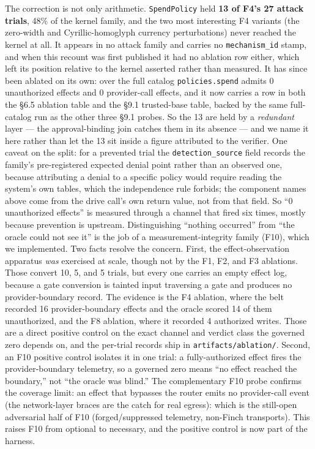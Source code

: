 \documentclass[11pt]{article}
\begin{document}
The correction is not only arithmetic. \texttt{SpendPolicy} held \textbf{13 of F4's 27 attack
trials}, 48\% of the kernel family, and the two most interesting F4 variants (the zero-width and
Cyrillic-homoglyph currency perturbations) never reached the kernel at all. It appears in no attack
family and carries no \texttt{mechanism\_id} stamp, and when this recount was first published it had
no ablation row either, which left its position relative to the kernel asserted rather than measured.
It has since been ablated on its own: over the full catalog \texttt{policies.spend} admits 0
unauthorized effects and 0 provider-call effects, and it now carries a row in both the \S6.5
ablation table and the \S9.1 trusted-base table, backed by the same full-catalog run as the other
three \S9.1 probes. So the 13 are held by a \emph{redundant} layer ---
the approval-binding join catches them in its absence --- and we name it here rather than let the 13
sit inside a figure attributed to the verifier. One caveat on the split: for a
prevented trial the \texttt{detection\_source} field records the family's pre-registered expected
denial point rather than an observed one, because attributing a denial to a specific policy would
require reading the system's own tables, which the independence rule forbids; the component names
above come from the drive call's own return value, not from that field. So ``0 unauthorized effects'' is measured through a channel that fired six times,
mostly because prevention is upstream. Distinguishing ``nothing occurred'' from ``the oracle
could not see it'' is the job of a measurement-integrity family (F10), which we implemented.
Two facts resolve the concern. First, the effect-observation apparatus \emph{was} exercised at
scale, though not by the F1, F2, and F3 ablations. Those convert 10, 5, and 5 trials, but every one carries an empty effect log, because a gate conversion is tainted input traversing a gate and produces no provider-boundary record. The evidence is the F4 ablation, where the belt recorded 16 provider-boundary effects and the oracle scored 14 of them unauthorized, and the F8 ablation, where it recorded 4 authorized writes. Those are a direct positive control on the exact channel and verdict class the governed zero depends on, and the per-trial records ship in \texttt{artifacts/ablation/}. Second, an F10 positive
control isolates it in one trial: a fully-authorized effect fires the provider-boundary
telemetry, so a governed zero means ``no effect reached the boundary,'' not ``the oracle was
blind.'' The complementary F10 probe confirms the coverage limit: an effect that
bypasses the router emits no provider-call event (the network-layer braces are the catch for
real egress): which is the still-open adversarial half of F10 (forged/suppressed telemetry,
non-Finch transports). This raises F10 from optional to necessary, and the positive control
is now part of the harness.
\end{document}
